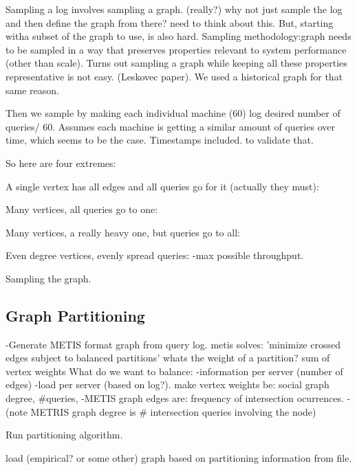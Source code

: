 \documentclass{article}
\begin{document}
Sampling a log involves sampling a graph. (really?) why not just sample the log and then define the graph from there? need to think about this.
But, starting witha  subset of the graph to use,  is also hard.
Sampling methodology:graph needs to be sampled in a way that preserves properties relevant to system performance (other than scale). Turns out sampling a graph while keeping all these properties
representative is not easy. (Leskovec paper). We used a historical graph for that same reason.

Then we sample by making each individual machine (60) log desired number of queries/ 60. Assumes each machine is getting a similar amount of queries over time, which seems to be the case.
Timestamps included. to validate that.


So here are four extremes:

A single vertex has all edges and  all queries go for it (actually they must):

Many vertices, all queries go to one:

Many vertices, a really heavy one, but queries go to all:

Even degree vertices, evenly spread queries:
-max possible throughput.

Sampling the graph. 

\subsection{Graph Partitioning}

-Generate METIS format graph from query log.
metis solves: 'minimize crossed edges subject to balanced partitions'
whats the weight of a partition? sum of vertex weights
What do we want to balance:
-information per server (number of edges)
-load per server (based on log?). make vertex weights be: social graph degree, #queries, 
-METIS graph edges are: frequency of intersection ocurrences.
-(note METRIS graph degree is # intersection queries involving the node)

Run partitioning algorithm.

load (empirical? or some other) graph based on partitioning information from file.
\end{document}

